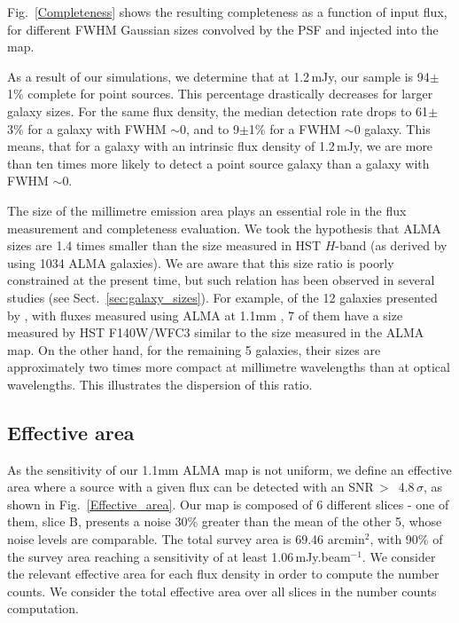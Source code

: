 \documentclass[longauth]{aa}
\begin{document}
Fig.~\ref{Completeness} shows the resulting completeness as a function of input flux, for different FWHM Gaussian sizes convolved by the PSF and injected into the map.

As a result of our simulations, we determine that at 1.2\,mJy, our sample is 94$\pm$1\% complete for point sources. This percentage drastically decreases for larger galaxy sizes. For the same flux density, the median detection rate drops to 61$\pm$3\% for a galaxy with FWHM $\sim$0, and to 9$\pm$1\% for a FWHM $\sim$0 galaxy. This means, that for a galaxy with an intrinsic flux density of 1.2\,mJy, we are more than ten times more likely to detect a point source galaxy than a galaxy with FWHM $\sim$0. 

The size of the millimetre emission area plays an essential role in the flux measurement and completeness evaluation. We took the hypothesis that ALMA sizes are 1.4 times smaller than the size measured in HST $H$-band (as derived by \citealt{Fujimoto2017} using 1034 ALMA galaxies). We are aware that this size ratio is poorly constrained at the present time, but such relation has been observed in several studies (see Sect.~\ref{sec:galaxy_sizes}). For example, of the 12 galaxies presented by \cite{Laporte2017}, with fluxes measured using ALMA at 1.1mm \citep{Gonzalez-Lopez2017}, 7 of them have a size measured by HST F140W/WFC3 similar to the size measured in the ALMA map. On the other hand, for the remaining 5 galaxies, their sizes are approximately two times more compact at millimetre wavelengths than at optical wavelengths. This illustrates the dispersion of this ratio.


\subsection{Effective area}

As the sensitivity of our 1.1mm ALMA map is not uniform, we define an effective area where a source with a given flux can be detected with an SNR\,$>$\, 4.8\,$\sigma$, as shown in Fig.~\ref{Effective_area}. Our map is composed of 6 different slices - one of them, slice B, presents a noise 30\% greater than the mean of the other 5, whose noise levels are comparable. The total survey area is 69.46 arcmin$^2$, with 90\% of the survey area reaching a sensitivity of at least 1.06\,mJy.beam$^{-1}$. We consider the relevant effective area for each flux density in order to compute the number counts. We consider the total effective area over all slices in the number counts computation.
\end{document}
